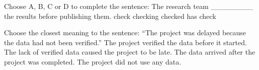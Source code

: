 \begin{ex}
Choose A, B, C or D to complete the sentence: The research team ________ the results before publishing them.
\choice
{check}
{checking}
{\True checked}
{has check}
\end{ex}

\begin{ex}
Choose the closest meaning to the sentence: “The project was delayed because the data had not been verified.”
\choice
{The project verified the data before it started.}
{\True The lack of verified data caused the project to be late.}
{The data arrived after the project was completed.}
{The project did not use any data.}
\end{ex}
